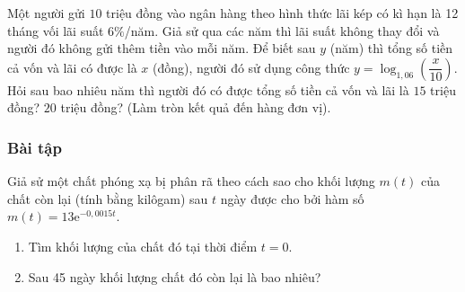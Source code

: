 \begin{vd}%
	Một người gửi $10$ triệu đồng vào ngân hàng theo hình thức lãi kép có kì hạn là 12 tháng vối lãi suất $6\%$/năm. Giả sử qua các năm thì lãi suất không thay đổi và người đó không gửi thêm tiền vào mỗi năm. Để biết sau $y$ (năm) thì tổng số tiền cả vốn và lãi có được là $x$ (đồng), người đó sử dụng công thức $y=\log_{1,06}\left(\dfrac{x}{10}\right)$. Hỏi sau bao nhiêu năm thì người đó có được tổng số tiền cả vốn và lãi là $15$ triệu đồng? $20$ triệu đồng? (Làm tròn kết quả đến hàng đơn vị).
\end{vd}
\subsubsection{Bài tập}
\begin{bt}%
	Giả sử một chất phóng xạ bị phân rã theo cách sao cho khối lượng $m(t)$ của chất còn lại (tính bằng kilôgam) sau $t$ ngày được cho bởi hàm số $m(t) = 13 \mathrm{e}^{-0,0015t}$.
	\begin{enumerate}
		\item Tìm khối lượng của chất đó tại thời điểm $t = 0$.
		\item Sau 45 ngày khối lượng chất đó còn lại là bao nhiêu?
	\end{enumerate}
\end{bt}


